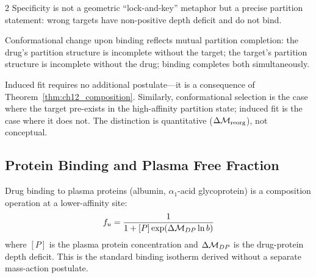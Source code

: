\begin{multicols}{2}
Specificity is not a geometric ``lock-and-key'' metaphor but a precise partition statement: wrong targets have non-positive depth deficit and do not bind.

\begin{corollary}
\label{cor:ch12_induced_fit}
Conformational change upon binding reflects mutual partition completion: the drug's partition structure is incomplete without the target; the target's partition structure is incomplete without the drug; binding completes both simultaneously.
\end{corollary}

Induced fit requires no additional postulate---it is a consequence of Theorem~\ref{thm:ch12_composition}. Similarly, conformational selection is the case where the target pre-exists in the high-affinity partition state; induced fit is the case where it does not. The distinction is quantitative ($\Delta\mathcal{M}_{\mathrm{reorg}}$), not conceptual.

\subsection{Protein Binding and Plasma Free Fraction}

Drug binding to plasma proteins (albumin, $\alpha_1$-acid glycoprotein) is a composition operation at a lower-affinity site:
\begin{equation}
f_u = \frac{1}{1 + [P]\exp(\Delta\mathcal{M}_{DP}\ln b)}
\label{eq:ch12_fu}
\end{equation}
where $[P]$ is the plasma protein concentration and $\Delta\mathcal{M}_{DP}$ is the drug-protein depth deficit. This is the standard binding isotherm derived without a separate mass-action postulate.

\end{multicols}

